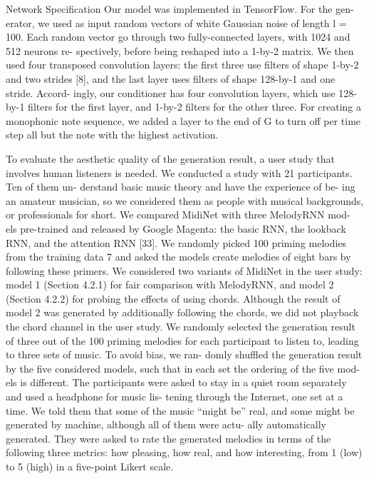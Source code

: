 Network Specification
Our model was implemented in TensorFlow. For the gen- erator, we used as input random vectors of white Gaussian noise of length l = 100. Each random vector go through two fully-connected layers, with 1024 and 512 neurons re- spectively, before being reshaped into a 1-by-2 matrix. We then used four transposed convolution layers: the first three use filters of shape 1-by-2 and two strides [8], and the last layer uses filters of shape 128-by-1 and one stride. Accord- ingly, our conditioner has four convolution layers, which use 128-by-1 filters for the first layer, and 1-by-2 filters for the other three. For creating a monophonic note sequence, we added a layer to the end of G to turn off per time step all but the note with the highest activation.

To evaluate the aesthetic quality of the generation result, a user study that involves human listeners is needed. We conducted a study with 21 participants. Ten of them un- derstand basic music theory and have the experience of be- ing an amateur musician, so we considered them as people with musical backgrounds, or professionals for short. We compared MidiNet with three MelodyRNN mod-
els pre-trained and released by Google Magenta: the basic RNN, the lookback RNN, and the attention RNN [33]. We randomly picked 100 priming melodies from the training data 7 and asked the models create melodies of eight bars by following these primers. We considered two variants of MidiNet in the user study: model 1 (Section 4.2.1) for fair comparison with MelodyRNN, and model 2 (Section 4.2.2) for probing the effects of using chords. Although the result of model 2 was generated by additionally following the chords, we did not playback the chord channel in the user study. We randomly selected the generation result of three out
of the 100 priming melodies for each participant to listen to, leading to three sets of music. To avoid bias, we ran- domly shuffled the generation result by the five considered models, such that in each set the ordering of the five mod- els is different. The participants were asked to stay in a quiet room separately and used a headphone for music lis- tening through the Internet, one set at a time. We told them that some of the music “might be” real, and some might be generated by machine, although all of them were actu- ally automatically generated. They were asked to rate the generated melodies in terms of the following three metrics: how pleasing, how real, and how interesting, from 1 (low) to 5 (high) in a five-point Likert scale.

